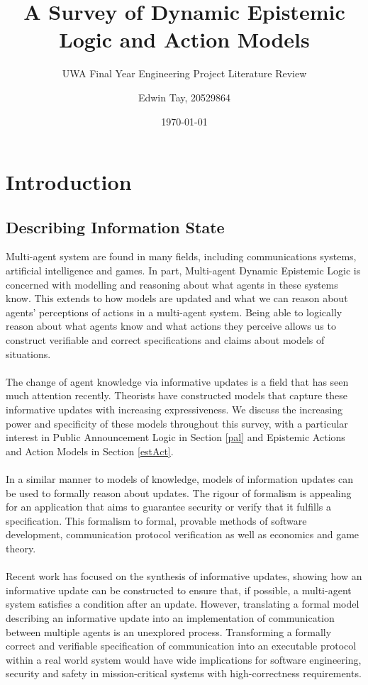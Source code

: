 \documentclass[12pt, a4paper, titlepage]{scrartcl}
\begin{document}
\title{A Survey of Dynamic Epistemic Logic and Action Models}
\subtitle{UWA Final Year Engineering Project Literature Review}
\author{Edwin Tay, 20529864}
\date{\today}

\maketitle

\pagebreak

\tableofcontents

\vfill
\pagebreak

\section{Introduction}\label{intro}
\subsection{Describing Information State}\label{intro_infoState}
Multi-agent system are found in many fields, including communications systems,
artificial intelligence and games.
In part, Multi-agent Dynamic Epistemic Logic is concerned with modelling and reasoning
about what agents in these systems know.
This extends to how models are updated and what we can reason about agents'
perceptions of actions in a multi-agent system.
Being able to logically reason about what agents know and what actions they perceive
allows us to construct verifiable and correct specifications and claims about
models of situations.\\
\\
The change of agent knowledge via informative updates is a field that has seen
much attention recently.
Theorists have constructed models that capture these informative updates with
increasing expressiveness.
We discuss the increasing power and specificity of these models throughout this
survey, with a particular interest in Public Announcement Logic in Section
\ref{pal} and Epistemic Actions and Action Models in Section \ref{estAct}. \\
\\
In a similar manner to models of knowledge, models of information updates can be
used to formally reason about updates.
The rigour of formalism is appealing for an application that aims to guarantee
security or verify that it fulfills a specification.
This formalism to formal, provable methods of software development,
communication protocol verification as well as economics and game theory.\\
\\
Recent work has focused on the synthesis of informative updates, showing how an
informative update can be constructed to ensure that, if possible, a multi-agent system
satisfies a condition after an update. \cite{hales13synthesis}
However, translating a formal model describing an informative update into an
implementation of communication between multiple agents is an unexplored
process.
Transforming a formally correct and verifiable specification of
communication into an executable protocol within a real world system would have
wide implications for software engineering, security and safety in
mission-critical systems with high-correctness requirements.
\end{document}
